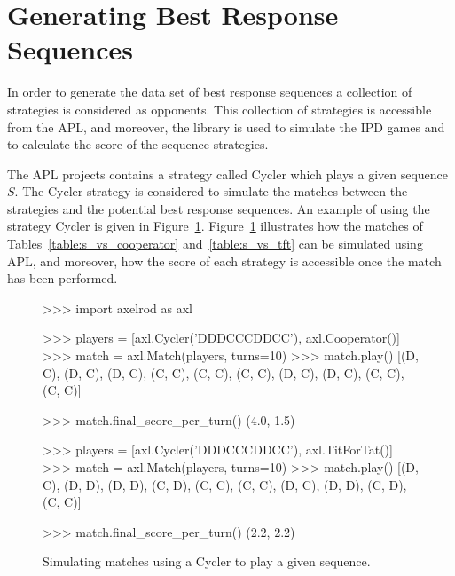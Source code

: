 \section{Generating Best Response Sequences}\label{section:generating_sequences}

In order to generate the data set of best response sequences a collection of
\numberofstrategiesbestsequences strategies is considered as opponents. This
collection of strategies is accessible from the APL, and moreover,
the library is used to simulate the IPD games and to calculate the score
of the sequence strategies.

The APL projects contains a strategy called Cycler which plays a given sequence
\(S\). The Cycler strategy is considered to simulate the matches between the
\numberofstrategiesbestsequences strategies and the potential best response
sequences. An example of using the strategy Cycler is given in
Figure~\ref{fig:apl_simulations_cycler}. Figure~\ref{fig:apl_simulations_cycler}
illustrates how the matches of Tables~\ref{table:s_vs_cooperator}
and~\ref{table:s_vs_tft} can be simulated using APL, and moreover, how the score
of each strategy is accessible once the match has been performed.

\begin{figure}[!htbp]
    \begin{usagepy}
>>> import axelrod as axl

>>> players = [axl.Cycler('DDDCCCDDCC'), axl.Cooperator()]
>>> match = axl.Match(players, turns=10)
>>> match.play()
[(D, C), (D, C), (D, C), (C, C), (C, C), (C, C), (D, C), (D, C), (C, C), (C, C)]

>>> match.final_score_per_turn()
(4.0, 1.5)

>>> players = [axl.Cycler('DDDCCCDDCC'), axl.TitForTat()]
>>> match = axl.Match(players, turns=10)
>>> match.play()
[(D, C), (D, D), (D, D), (C, D), (C, C), (C, C), (D, C), (D, D), (C, D), (C, C)]

>>> match.final_score_per_turn()
(2.2, 2.2)

\end{usagepy}
\caption{Simulating matches using a Cycler to play a given sequence.}\label{fig:apl_simulations_cycler}
\end{figure}


